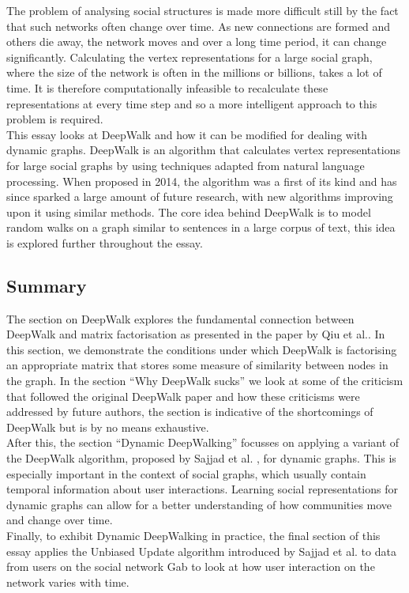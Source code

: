 \documentclass[a4paper]{article}
\begin{document}
The problem of analysing social structures is made more difficult still by the
fact that such networks often change over time. As new connections are formed
and others die away, the network moves and over a long time period, it can
change significantly. Calculating the vertex representations for a large social
graph, where the size of the network is often in the millions or billions, takes
a lot of time. It is therefore computationally infeasible to recalculate these
representations at every time step and so a more intelligent approach to this
problem is required.\\
This essay looks at DeepWalk and how it can be modified for dealing with dynamic
graphs. DeepWalk is an algorithm that calculates vertex representations for
large social graphs by using techniques adapted from natural language processing. When proposed in 2014, the algorithm was a first of its kind and has since sparked a large amount of future research, with new algorithms improving upon it using similar methods. The core idea behind DeepWalk is to model random walks on a graph similar to sentences in a large corpus of text, this idea is explored further throughout the essay.


\subsection{Summary}
The section on DeepWalk explores the fundamental connection between DeepWalk and
matrix factorisation as presented in the paper by Qiu et al.\cite{qiu2018}. In
this section, we demonstrate the conditions under which DeepWalk is factorising
an appropriate matrix that stores some measure of similarity between
nodes in the graph. In the section ``Why DeepWalk sucks'' we look at some of the
criticism that followed the original DeepWalk paper and how these criticisms
were addressed by future authors, the section is indicative of the shortcomings
of DeepWalk but is by no means exhaustive.\\
After this, the section ``Dynamic DeepWalking'' focusses on applying a variant of the DeepWalk algorithm, proposed
by Sajjad et al. \cite{sajjad2019}, for dynamic graphs. This is especially
important in the context of social graphs, which usually contain temporal information
about user interactions. Learning social
representations for dynamic graphs can allow for a better understanding of how
communities move and change over time.\\
Finally, to exhibit Dynamic DeepWalking in practice, the final section of this
essay applies the Unbiased Update algorithm introduced by Sajjad et
al.\cite{sajjad2019} to data from users on the social network Gab to look at how
user interaction on the network varies with time. 
\end{document}
